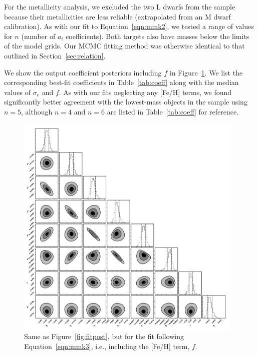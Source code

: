 \documentclass[twocolumn]{aastex62}
\newcommand{\order}{5}
\begin{document}
For the metallicity analysis, we excluded the two L dwarfs from the sample because their metallicities are less reliable (extrapolated from an M dwarf calibration). As with our fit to Equation~\ref{eqn:mmk2}, we tested a range of values for $n$ (number of $a_i$ coefficients). Both targets also have masses below the limits of the model grids. Our MCMC fitting method was otherwise identical to that outlined in Section~\ref{sec:relation}. 

We show the output coefficient posteriors including $f$ in Figure~\ref{fig:fitpost_feh}. We list the corresponding best-fit coefficients in Table~\ref{tab:coeff} along with the median values of $\sigma_e$ and $f$. As with our fits neglecting any [Fe/H] terms, we found significantly better agreement with the lowest-mass objects in the sample using $n=\order$, although $n=4$ and $n=6$ are listed in Table~\ref{tab:coeff} for reference. 

\begin{figure}[p]
\begin{center}
\includegraphics[width=0.97\textwidth]{output_8feh_eMass.pdf}
\caption{Same as Figure~\ref{fig:fitpost}, but for the fit following Equation~\ref{eqn:mmk3}, i.e., including the [Fe/H] term, $f$. }
\label{fig:fitpost_feh}
\end{center}
\end{figure}
\end{document}
